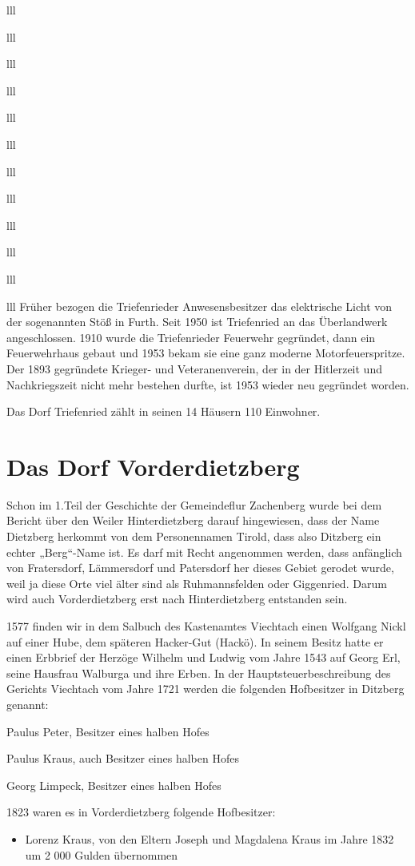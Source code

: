 \documentclass[12pt,a4pager]{book}
\begin{document}
\begin{tabuluar}{lll}
\begin{tabuluar}{lll}
\begin{tabuluar}{lll}
\begin{tabuluar}{lll}
\begin{tabuluar}{lll}
\begin{tabuluar}{lll}
\begin{tabuluar}{lll}
\begin{tabuluar}{lll}
\begin{tabuluar}{lll}
\begin{tabuluar}{lll}
\begin{tabuluar}{lll}
\begin{tabuluar}{lll}
Früher bezogen die Triefenrieder Anwesensbesitzer das elektrische Licht von der
sogenannten Stöß in Furth. Seit 1950 ist Triefenried an das Überlandwerk
angeschlossen. 1910 wurde die Triefenrieder Feuerwehr gegründet, dann ein
Feuerwehrhaus gebaut und 1953 bekam sie eine ganz moderne Motorfeuerspritze. Der
1893 gegründete Krieger- und Veteranenverein, der in der Hitlerzeit und
Nachkriegszeit nicht mehr bestehen durfte, ist 1953 wieder neu gegründet worden.

Das Dorf Triefenried zählt in seinen 14 Häusern 110 Einwohner.

\section{Das Dorf Vorderdietzberg}

Schon im 1.Teil der Geschichte der Gemeindeflur Zachenberg wurde bei dem Bericht
über den Weiler Hinterdietzberg darauf hingewiesen, dass der Name Dietzberg
herkommt von dem Personennamen Tirold, dass also Ditzberg ein echter „Berg“-Name
ist. Es darf mit Recht angenommen werden, dass anfänglich von Fratersdorf,
Lämmersdorf und Patersdorf her dieses Gebiet gerodet wurde, weil ja diese Orte
viel älter sind als Ruhmannsfelden oder Giggenried. Darum wird auch
Vorderdietzberg erst nach Hinterdietzberg entstanden sein.

1577 finden wir in dem Salbuch des Kastenamtes Viechtach einen Wolfgang Nickl
auf einer Hube, dem späteren Hacker-Gut (Hackö). In seinem Besitz hatte er einen
Erbbrief der Herzöge Wilhelm und Ludwig vom Jahre 1543 auf Georg Erl, seine
Hausfrau Walburga und ihre Erben. In der Hauptsteuerbeschreibung des Gerichts
Viechtach vom Jahre 1721 werden die folgenden Hofbesitzer in Ditzberg genannt:

\begin{compactitem}
\item Paulus Peter, Besitzer eines halben Hofes
\item Paulus Kraus, auch Besitzer eines halben Hofes
\item Georg Limpeck, Besitzer eines halben Hofes
\end{compactitem}

1823 waren es in Vorderdietzberg folgende Hofbesitzer:

\begin{itemize}
\item Lorenz Kraus, von den Eltern Joseph und Magdalena Kraus im Jahre 1832 um 2
000 Gulden übernommen


\end{itemize}
\end{tabuluar}
\end{tabuluar}
\end{tabuluar}
\end{tabuluar}
\end{tabuluar}
\end{tabuluar}
\end{tabuluar}
\end{tabuluar}
\end{tabuluar}
\end{tabuluar}
\end{tabuluar}
\end{tabuluar}
\end{document}
